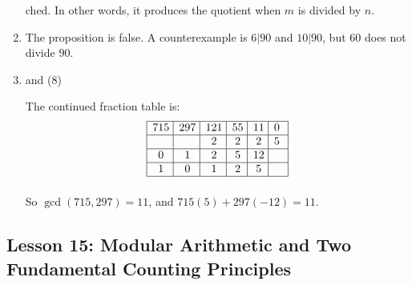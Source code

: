 \documentclass[11pt]{amsart}
\begin{document}
\begin{enumerate}
ched. In other words, it produces the quotient when $m$ is divided by $n$.

\medskip

\item The proposition is false. A counterexample is $6|90$ and $10|90$, but $60$ does not divide $90$.

\medskip

\item and (8)

\medskip

 The continued fraction table is:
\[
\vbox{\offinterlineskip
\halign{\strut \vrule \hskip .5em \hss $#$ \hss & 
\vrule \hskip .5em \hss $#$ \hss & 
\vrule \hskip .5em \hss $#$ \hss & 
\vrule \hskip .5em \hss $#$ \hss &  
\vrule \hskip .5em \hss $#$ \hss & 
\vrule \hskip .5em \hss $#$ \hss\kern 4pt\vrule
 \cr
\noalign{\hrule}
715&297&121&55&11&0\cr
\noalign{\hrule}
 &&2&2&2&5\cr
\noalign{\hrule}
0&1&2&5&12&\cr
\noalign{\hrule}
1&0&1&2&5&\cr
\noalign{\hrule}
}}
\]

So $\gcd(715,297) = 11$, and $715(5) + 297(-12) = 11$.
\end{enumerate}

\subsection{Lesson 15: Modular Arithmetic and Two Fundamental Counting Principles}
\end{document}
